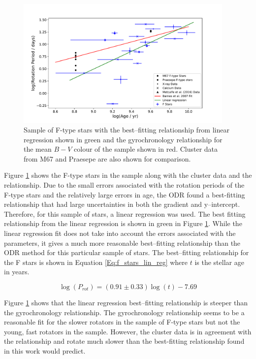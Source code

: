\begin{figure}[!ht]
    \centering
    \includegraphics[width=0.95\textwidth]{Figures/5-Activity_rotation/f_prot_v_age_LR.pdf}
    \caption{Sample of F-type stars with the best--fitting relationship from linear regression shown in green and the \citet{Barnes_2007} gyrochronology relationship for the mean $B-V$ colour of the sample shown in red. Cluster data from M67 and Praesepe are also shown for comparison.}
    \label{fig:f_prot_v_age}
\end{figure}

Figure \ref{fig:f_prot_v_age} shows the F-type stars in the sample along with the cluster data and the \citet{Barnes_2007} relationship. Due to the small errors associated with the rotation periods of the F-type stars and the relatively large errors in age, the ODR found a best-fitting relationship that had large uncertainties in both the gradient and y--intercept. Therefore, for this sample of stars, a linear regression was used. The best fitting relationship from the linear regression is shown in green in Figure \ref{fig:f_prot_v_age}. While the linear regression fit does not take into account the errors associated with the parameters, it gives a much more reasonable best--fitting relationship than the ODR method for this particular sample of stars. The best--fitting relationship for the F stars is shown in Equation \ref{Eq:f_stars_lin_reg} where $t$ is the stellar age in years.

\begin{equation}
    \log(P_{rot}) = (0.91 \pm 0.33)\log(t) -7.69
    \label{Eq:f_stars_lin_reg}
\end{equation}


Figure \ref{fig:f_prot_v_age} shows that the linear regression best--fitting relationship is steeper than the gyrochronology relationship. The gyrochronology relationship seems to be a reasonable fit for the slower rotators in the sample of F-type stars but not the young, fast rotators in the sample. However, the cluster data is in agreement with the \citet{Barnes_2007} relationship and rotate much slower than the best-fitting relationship found in this work would predict.

